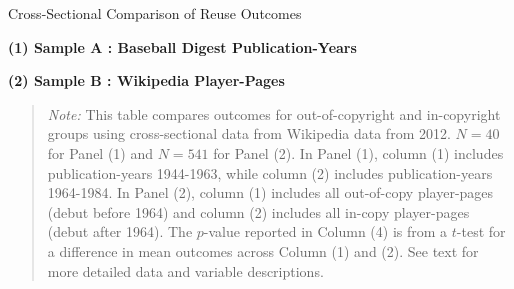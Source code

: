 \begin{center}
\begin{table}[!htbp]
\vspace{15mm}
\caption{Cross-Sectional Comparison of Reuse Outcomes}
\vspace{5mm}

\caption*{\small{\textbf{(1) Sample A : Baseball Digest Publication-Years}}}
\begin{center}

\end{center}
\vspace{10mm}

\caption*{\small{\textbf{(2) Sample B : Wikipedia Player-Pages}}}
\begin{center}

\end{center}
\label{tab:ttest}

\begin{quote}
\vspace{5mm}
\emph{Note:} This table compares outcomes for out-of-copyright and in-copyright groups using cross-sectional data from Wikipedia data from 2012. $N=40$ for Panel (1) and $N=541$ for Panel (2). In Panel (1), column (1) includes publication-years 1944-1963, while column (2) includes publication-years 1964-1984. In Panel (2), column (1) includes all out-of-copy player-pages (debut before 1964) and column (2) includes all in-copy player-pages (debut after 1964). The $p$-value reported in Column (4) is from a $t$-test for a difference in mean outcomes across Column (1) and (2). See text for more detailed data and variable descriptions. 
\end{quote}

\end{table}
\end{center}


